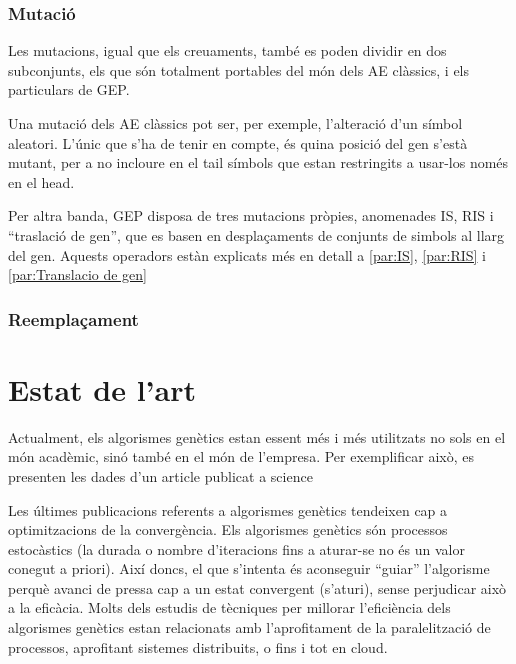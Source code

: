 \subsubsection{Mutació} %
\label{ssub:Mutacio}
Les mutacions, igual que els creuaments, també es poden dividir en dos
subconjunts, els que són totalment portables del món dels AE clàssics, i els
particulars de GEP.

Una mutació dels AE clàssics pot ser, per exemple, l'alteració d'un símbol
aleatori.  L'únic que s'ha de tenir en compte, és quina posició del gen s'està
mutant, per a no incloure en el tail símbols que estan restringits a usar-los
només en el head.

Per altra banda, GEP disposa de tres mutacions pròpies, anomenades IS, RIS i
``traslació de gen'', que es basen en desplaçaments de conjunts de simbols al
llarg del gen.  Aquests operadors estàn explicats més en detall a \ref{par:IS},
\ref{par:RIS} i \ref{par:Translacio de gen}

\subsubsection{Reemplaçament} %
\label{ssub:Reemplacament}


\section{Estat de l'art} %
\label{sec:Estat de l'art}

Actualment, els algorismes genètics estan essent més i més utilitzats no sols en
el món acadèmic, sinó també en el món de l'empresa.  Per exemplificar això, es
presenten les dades d'un article publicat a science

Les últimes publicacions referents a algorismes genètics tendeixen cap a
optimitzacions de la convergència.  Els algorismes genètics són processos
estocàstics (la durada o nombre d'iteracions fins a aturar-se no és un valor
conegut a priori).  Així doncs, el que s'intenta és aconseguir ``guiar''
l'algorisme perquè avanci de pressa cap a un estat convergent (s'aturi), sense
perjudicar això a la eficàcia.  Molts dels estudis de tècniques per millorar
l'eficiència dels algorismes genètics estan relacionats amb l'aprofitament de la
paralelització de processos, aprofitant sistemes distribuits, o fins i tot en
cloud.  

